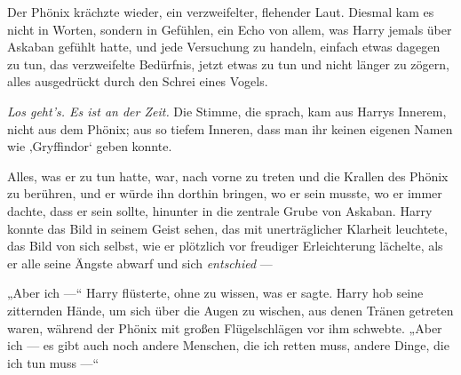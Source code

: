 Der Phönix krächzte wieder, ein verzweifelter, flehender Laut. Diesmal kam es nicht in Worten, sondern in Gefühlen, ein Echo von allem, was Harry jemals über Askaban gefühlt hatte, und jede Versuchung zu handeln, einfach etwas dagegen zu tun, das verzweifelte Bedürfnis, jetzt etwas zu tun und nicht länger zu zögern, alles ausgedrückt durch den Schrei eines Vogels.

\emph{Los geht’s. Es ist an der Zeit.}
Die Stimme, die sprach, kam aus Harrys Innerem, nicht aus dem Phönix; aus so tiefem Inneren, dass man ihr keinen eigenen Namen wie ‚Gryffindor‘ geben konnte.

Alles, was er zu tun hatte, war, nach vorne zu treten und die Krallen des Phönix zu berühren, und er würde ihn dorthin bringen, wo er sein musste, wo er immer dachte, dass er sein sollte, hinunter in die zentrale Grube von Askaban. Harry konnte das Bild in seinem Geist sehen, das mit unerträglicher Klarheit leuchtete, das Bild von sich selbst, wie er plötzlich vor freudiger Erleichterung lächelte, als er alle seine Ängste abwarf und sich \emph{entschied} —

„Aber ich —“ Harry flüsterte, ohne zu wissen, was er sagte. Harry hob seine zitternden Hände, um sich über die Augen zu wischen, aus denen Tränen getreten waren, während der Phönix mit großen Flügelschlägen vor ihm schwebte.
„Aber ich — es gibt auch noch andere Menschen, die ich retten muss, andere Dinge, die ich tun muss —“

